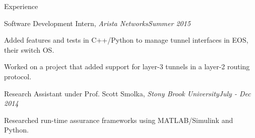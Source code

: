 \documentclass{resume} %
\begin{document}
\begin{rSection}{Experience}

\begin{rSubsection}{Software Development Intern, {\em Arista Networks}}{\em Summer 2015}{}{}
\item Added features and tests in C++/Python to manage tunnel interfaces in EOS, their switch OS.
\item Worked on a project that added support for layer-3 tunnels in a layer-2 routing protocol.
\end{rSubsection}

\begin{rSubsection}{Research Assistant under Prof. Scott Smolka, {\em Stony Brook University}}{\em July - Dec 2014}{}{}
\item Researched run-time assurance frameworks using MATLAB/Simulink and Python.
\end{rSubsection}

\end{rSection}
\end{document}
